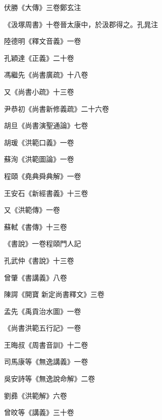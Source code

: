 \begin{pinyinscope}
 伏勝《大傳》三卷鄭玄注



 《汲塚周書》十卷晉太康中，於汲郡得之。孔晁注



 陸德明《釋文音義》一卷



 孔穎達《正義》二十卷



 馮繼先《尚書廣疏》十八卷



 又《尚書小疏》十三卷



 尹恭初《尚書新修義疏》二十六卷



 胡旦《尚書演聖通論》七卷



 胡瑗《洪範口義》一卷



 蘇洵《洪範圖論》一卷



 程頤《堯典舜典解》一卷



 王安石《新經書義》十三卷



 又《洪範傳》一卷



 蘇軾《書傳》十三卷



 《書說》一卷程頤門人記



 孔武仲《書說》十三卷



 曾肇《書講義》八卷



 陳諤《開寶
 新定尚書釋文》三卷



 孟先《禹貢治水圖》一卷



 《尚書洪範五行記》一卷



 王晦叔《周書音訓》十二卷



 司馬康等《無逸講義》一卷



 吳安詩等《無逸說命解》二卷



 劉彞《洪範解》六卷



 曾旼等《講義》三十卷




\end{pinyinscope}
